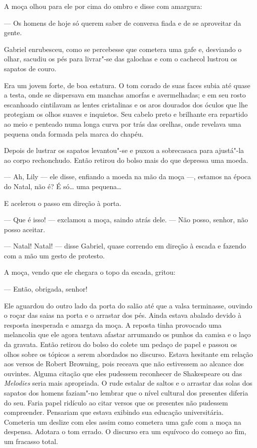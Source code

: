 A moça olhou para ele por cima do ombro e disse com amargura:

--- Os homens de hoje só querem saber de conversa fiada e de se aproveitar da
gente.

Gabriel enrubesceu, como se percebesse que cometera uma gafe e, desviando o
olhar, sacudiu os pés para livrar"-se das galochas e com o cachecol lustrou os
sapatos de couro.

Era um jovem forte, de boa estatura.  O tom corado de suas faces subia até
quase a testa, onde se dispersava em manchas amorfas e avermelhadas; e em seu
rosto escanhoado cintilavam as lentes cristalinas e os aros dourados dos óculos
que lhe protegiam os olhos suaves e inquietos.  Seu cabelo preto e brilhante
era repartido ao meio e penteado numa longa curva por trás das orelhas, onde
revelava uma pequena onda formada pela marca do chapéu.

Depois de lustrar os sapatos levantou"-se e puxou a sobrecasaca para ajustá"-la
ao corpo rechonchudo.  Então retirou do bolso mais do que depressa uma moeda.

--- Ah, Lily --- ele disse, enfiando a moeda na mão da moça ---, estamos na
época do Natal, não é?  É só\ldots{} uma pequena\ldots{}

E acelerou o passo em direção à porta.

--- Que é isso! --- exclamou a moça, saindo atrás dele.  --- Não posso, senhor,
não posso aceitar.

--- Natal!  Natal! --- disse Gabriel, quase correndo em direção à escada e
fazendo com a mão um gesto de protesto.

A moça, vendo que ele chegara o topo da escada, gritou:

--- Então, obrigada, senhor!

Ele aguardou do outro lado da porta do salão até que a valsa terminasse,
ouvindo o roçar das saias na porta e o arrastar dos pés.  Ainda estava abalado
devido à resposta inesperada e amarga da moça.  A reposta tinha provocado uma
melancolia que ele agora tentava afastar arrumando os punhos da camisa e o laço
da gravata.  Então retirou do bolso do colete um pedaço de papel e passou os
olhos sobre os tópicos a serem abordados no discurso.  Estava hesitante em
relação aos versos de Robert Browning, pois receava que não estivessem ao
alcance dos ouvintes.  Alguma citação que eles pudessem reconhecer de
Shakespeare ou das \textit{Melodies} seria mais apropriada.  O rude estalar de
saltos e o arrastar das solas dos sapatos dos homens faziam"-no lembrar que o
nível cultural dos presentes diferia do seu.  Faria papel ridículo ao citar
versos que os presentes não pudessem compreender.  Pensariam que estava
exibindo sua educação universitária.  Cometeria um deslize com eles assim como
cometera uma gafe com a moça na despensa.  Adotara o tom errado.  O discurso era um
equívoco do começo ao fim, um fracasso total.

